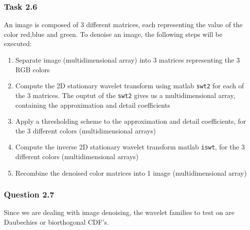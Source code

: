 \documentclass[a4paper]{article}
\begin{document}
    \subsubsection{Task 2.6} \label{subsubsec:RedDen}

	An image is composed of 3 different matrices, each representing the value of the color red,blue and green. To denoise an image, the following steps will be executed:
\begin{enumerate}
	\item Separate image (multidimensional array) into 3 matrices representing the 3 RGB colors
	\item Compute the 2D stationary wavelet transform using matlab \texttt{swt2} for each of the 3 matrices. The ouptut of the \texttt{swt2} gives us a multidimensional array, containing the approximation and detail coefficients
	\item Apply a thresholding scheme to the approximation and detail coefficients, for the 3 different colors (multidimensional arrays)
	\item Compute the inverse 2D stationary wavelet transform matlab \texttt{iswt}, for the 3 different colors (multidimensional arrays)
	\item Recombine the denoised color matrices into 1 image (multidimensional array)
\end{enumerate}

    \subsubsection{Question 2.7} \label{subsubsec:RedTest}
	Since we are dealing with image denoising, the wavelet families to test on are Daubechies or biorthogonal CDF's. \\
\end{document}
